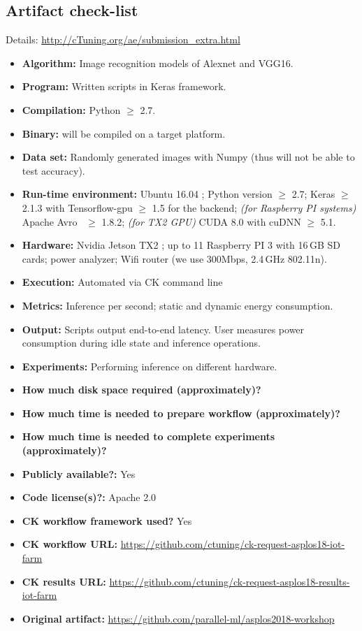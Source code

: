 \documentclass[sigplan]{acmart}
\begin{document}
\subsection{Artifact check-list}

Details: \url{http://cTuning.org/ae/submission_extra.html}

\begin{itemize}
  \item {\bf Algorithm:} Image recognition models of Alexnet and VGG16.
  \item {\bf Program:} Written scripts in Keras framework.
  \item {\bf Compilation:} Python $\geq$ 2.7.
  \item {\bf Binary:} will be compiled on a target platform.
  \item {\bf Data set:} Randomly generated images with Numpy (thus will not be able to test accuracy).
  \item {\bf Run-time environment:} Ubuntu 16.04 ; Python version $\geq$ 2.7; Keras $\geq$ 2.1.3 with Tensorflow-gpu $\geq$ 1.5 for the backend; \emph{(for Raspberry PI systems)} Apache Avro~\cite{apache} $\geq$ 1.8.2; \emph{(for TX2 GPU)} CUDA 8.0 with cuDNN $\geq$ 5.1.
  \item {\bf Hardware:} Nvidia Jetson TX2 ; up to 11 Raspberry PI 3 with 16\,GB SD cards; power analyzer; Wifi router (we use 300Mbps, 2.4\,GHz 802.11n).
  \item {\bf Execution:} Automated via CK command line
  \item {\bf Metrics:} Inference per second; static and dynamic energy consumption.
  \item {\bf Output:} Scripts output end-to-end latency. User measures power consumption during idle state and inference operations.
  \item {\bf Experiments:} Performing inference on different hardware.
  \item {\bf How much disk space required (approximately)?}
  \item {\bf How much time is needed to prepare workflow (approximately)?}
  \item {\bf How much time is needed to complete experiments (approximately)?}
  \item {\bf Publicly available?:} Yes
  \item {\bf Code license(s)?:} Apache 2.0
  \item {\bf CK workflow framework used?} Yes
  \item {\bf CK workflow URL:} \url{https://github.com/ctuning/ck-request-asplos18-iot-farm}
  \item {\bf CK results URL:} \url{https://github.com/ctuning/ck-request-asplos18-results-iot-farm}
  \item {\bf Original artifact:} \url{https://github.com/parallel-ml/asplos2018-workshop}

\end{itemize}
\end{document}

